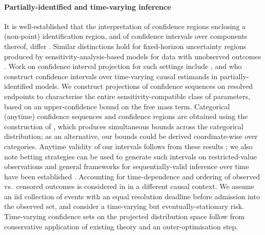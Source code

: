 \paragraph{Partially-identified and time-varying inference} 
It is well-established that the interpretation of confidence regions enclosing a (non-point) identification region, and of confidence intervals over components thereof, differ \citep{imbens2004}. Similar distinctions hold for fixed-horizon uncertainty regions produced by sensitivity-analysis-based models for data with unobserved outcomes \citep{vansteelandt2006}. Work on confidence interval projection for such settings include \citet{kaido2019}, and \citet{dalal2024} who construct confidence intervals over time-varying causal estimands in partially-identified models. We construct projections of confidence sequences on resolved endpoints to characterise the entire sensitivity-compatible class of parameters, based on an upper-confidence bound on the free mass term. Categorical (anytime) confidence sequences and confidence regions are obtained using the construction of \citet{lindon2022}, which produces simultaneous bounds across the categorical distribution; as an alternative, our bounds could be derived coordinate-wise over categories. Anytime validity of our intervals follows from these results \citep{howard2021,ramdas2023}; we also note betting strategies can be used to generate such intervals on restricted-value observations \citep{waudby2024} and general frameworks for sequentially-valid inference over time have been established \citep{johari2022}. Accounting for time-dependence and ordering of observed vs.\ censored outcomes is considered in \citep{lindon2026} in a different causal context. We assume an iid collection of events with an equal resolution deadline before admission into the observed set, and consider a time-varying but eventually-stationary risk. Time-varying confidence sets on the projected distribution space follow from conservative application of existing theory and an outer-optimisation step.